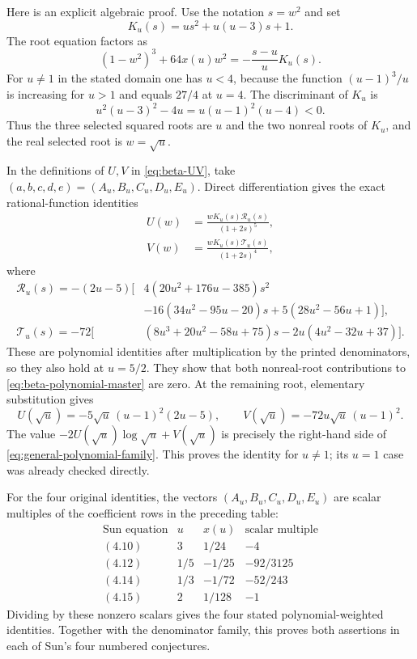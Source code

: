 \documentclass[11pt,a4paper]{article}
\theoremstyle{remark}\newtheorem{remark}[theorem]{Remark}
\numberwithin{equation}{section}
\begin{document}
Here is an explicit algebraic proof. Use the notation $s=w^2$ and set
\[
 K_u(s)=us^2+u(u-3)s+1.
\]
The root equation factors as
\[
 (1-w^2)^3+64x(u)w^2=-\frac{s-u}{u}K_u(s).
\]
For $u\ne1$ in the stated domain one has $u<4$, because the function
$(u-1)^3/u$ is increasing for $u>1$ and equals $27/4$ at $u=4$.
The discriminant of $K_u$ is
\[
 u^2(u-3)^2-4u=u(u-1)^2(u-4)<0.
\]
Thus the three selected squared roots are $u$ and the two nonreal roots of
$K_u$, and the real selected root is $w=\sqrt u$.

In the definitions of $U,V$ in \eqref{eq:beta-UV}, take
$(a,b,c,d,e)=(A_u,B_u,C_u,D_u,E_u)$. Direct differentiation gives the exact
rational-function identities
\begin{align}
 U(w)&=\frac{wK_u(s)\mathcal R_u(s)}{(1+2s)^5},
 \label{eq:general-U-certificate}\\
 V(w)&=\frac{wK_u(s)\mathcal T_u(s)}{(1+2s)^4},
 \label{eq:general-V-certificate}
\end{align}
where
\begin{align*}
 \mathcal R_u(s)=-(2u-5)\bigl[&4(20u^2+176u-385)s^2\\
                   &-16(34u^2-95u-20)s
                    +5(28u^2-56u+1)\bigr],\\
 \mathcal T_u(s)=-72\bigl[&(8u^3+20u^2-58u+75)s
                     -2u(4u^2-32u+37)\bigr].
\end{align*}
These are polynomial identities after multiplication by the printed
denominators, so they also hold at $u=5/2$. They show that both nonreal-root
contributions to \eqref{eq:beta-polynomial-master} are zero. At the remaining
root, elementary substitution gives
\[
 U(\sqrt u)=-5\sqrt u\,(u-1)^2(2u-5),\qquad
 V(\sqrt u)=-72u\sqrt u\,(u-1)^2.
\]
The value $-2U(\sqrt u)\log\sqrt u+V(\sqrt u)$ is precisely the right-hand
side of \eqref{eq:general-polynomial-family}. This proves the identity for
$u\ne1$; its $u=1$ case was already checked directly.

For the four original identities, the vectors
$(A_u,B_u,C_u,D_u,E_u)$ are scalar multiples of the coefficient rows in the
preceding table:
\[
 \begin{array}{c|c|c|c}
 \text{Sun equation}&u&x(u)&\text{scalar multiple}\\\hline
 (4.10)&3&1/24&-4\\
 (4.12)&1/5&-1/25&-92/3125\\
 (4.14)&1/3&-1/72&-52/243\\
 (4.15)&2&1/128&-1
 \end{array}
\]
Dividing by these nonzero scalars gives the four stated polynomial-weighted
identities. Together with the denominator family, this proves both assertions
in each of Sun's four numbered conjectures.
\end{document}
